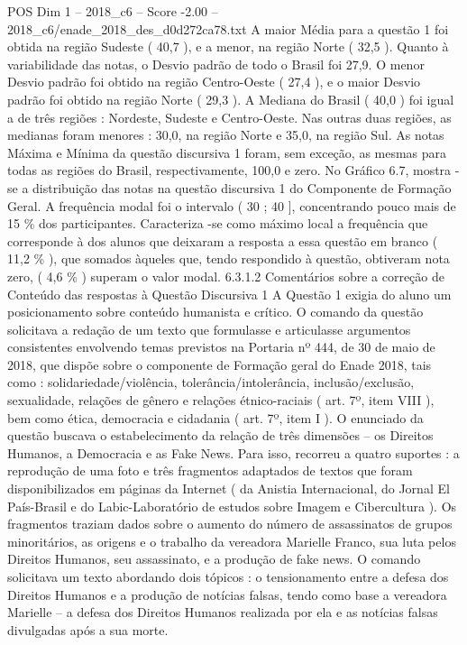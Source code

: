 \begin{textsample}{POS Dim 1 – 2018\_c6 – Score -2.00 – 2018\_c6/enade\_2018\_des\_d0d272ca78.txt}
A maior Média para a questão 1 foi obtida na região Sudeste ( 40,7 ), e a menor, na região Norte ( 32,5 ).
Quanto à variabilidade das notas, o Desvio padrão de todo o Brasil foi 27,9.
O menor Desvio padrão foi obtido na região Centro-Oeste ( 27,4 ), e o maior Desvio padrão foi obtido na região Norte ( 29,3 ).
A Mediana do Brasil ( 40,0 ) foi igual a de três regiões : Nordeste, Sudeste e Centro-Oeste.
Nas outras duas regiões, as medianas foram menores : 30,0, na região Norte e 35,0, na região Sul.
As notas Máxima e Mínima da questão discursiva 1 foram, sem exceção, as mesmas para todas as regiões do Brasil, respectivamente, 100,0 e zero.
No Gráfico 6.7, mostra -se a distribuição das notas na questão discursiva 1 do Componente de Formação Geral.
A frequência modal foi o intervalo ( 30 ; 40 ], concentrando pouco mais de 15 \% dos participantes.
Caracteriza -se como máximo local a frequência que corresponde à dos alunos que deixaram a resposta a essa questão em branco ( 11,2 \% ), que somados àqueles que, tendo respondido à questão, obtiveram nota zero, ( 4,6 \% ) superam o valor modal. 6.3.1.2 Comentários sobre a correção de Conteúdo das respostas à Questão Discursiva 1 A Questão 1 exigia do aluno um posicionamento sobre conteúdo humanista e crítico.
O comando da questão solicitava a redação de um texto que formulasse e articulasse argumentos consistentes envolvendo temas previstos na Portaria nº 444, de 30 de maio de 2018, que dispõe sobre o componente de Formação geral do Enade 2018, tais como : solidariedade/violência, tolerância/intolerância, inclusão/exclusão, sexualidade, relações de gênero e relações étnico-raciais ( art. 7º, item VIII ), bem como ética, democracia e cidadania ( art. 7º, item I ).
O enunciado da questão buscava o estabelecimento da relação de três dimensões – os Direitos Humanos, a Democracia e as Fake News.
Para isso, recorreu a quatro suportes : a reprodução de uma foto e três fragmentos adaptados de textos que foram disponibilizados em páginas da Internet ( da Anistia Internacional, do Jornal El País-Brasil e do Labic-Laboratório de estudos sobre Imagem e Cibercultura ).
Os fragmentos traziam dados sobre o aumento do número de assassinatos de grupos minoritários, as origens e o trabalho da vereadora Marielle Franco, sua luta pelos Direitos Humanos, seu assassinato, e a produção de fake news.
O comando solicitava um texto abordando dois tópicos : o tensionamento entre a defesa dos Direitos Humanos e a produção de notícias falsas, tendo como base a vereadora Marielle – a defesa dos Direitos Humanos realizada por ela e as notícias falsas divulgadas após a sua morte.

\end{textsample}
